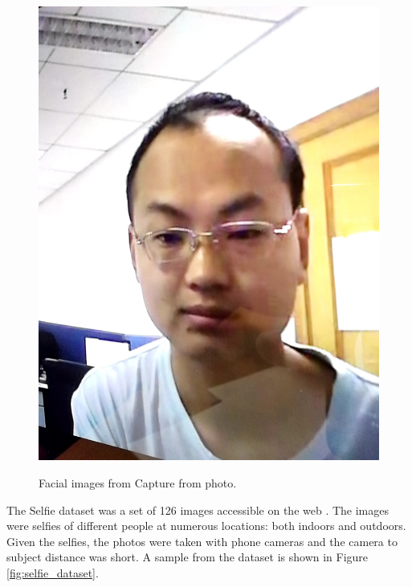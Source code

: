\begin{figure}[h]
        {\includegraphics[scale = 0.09]{figures/5_0.97369.jpg}\hspace{0.42cm}}
    \caption{Facial images from Capture from photo.}
    \label{fig:capture_from_photo}
\end{figure}
%
The Selfie dataset was a set of 126 images accessible on the web \cite{selfie-dataset}. The images were selfies of different people at numerous locations: both indoors and outdoors. Given the selfies, the photos were taken with phone cameras and the camera to subject distance was short. A sample from the dataset is shown in Figure \ref{fig:selfie_dataset}. 
%
